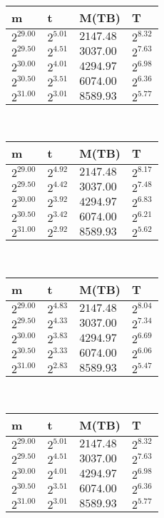  \ 
\begin{tabular}{llll}
m & t & M(TB) & T \\ \hline
$2^{29.00}$ & $2^{5.01}$ & $2147.48$ & $2^{8.32}$ \\
$2^{29.50}$ & $2^{4.51}$ & $3037.00$ & $2^{7.63}$ \\
$2^{30.00}$ & $2^{4.01}$ & $4294.97$ & $2^{6.98}$ \\
$2^{30.50}$ & $2^{3.51}$ & $6074.00$ & $2^{6.36}$ \\
$2^{31.00}$ & $2^{3.01}$ & $8589.93$ & $2^{5.77}$ \\
\end{tabular}
 \ 
\begin{tabular}{llll}
m & t & M(TB) & T \\ \hline
$2^{29.00}$ & $2^{4.92}$ & $2147.48$ & $2^{8.17}$ \\
$2^{29.50}$ & $2^{4.42}$ & $3037.00$ & $2^{7.48}$ \\
$2^{30.00}$ & $2^{3.92}$ & $4294.97$ & $2^{6.83}$ \\
$2^{30.50}$ & $2^{3.42}$ & $6074.00$ & $2^{6.21}$ \\
$2^{31.00}$ & $2^{2.92}$ & $8589.93$ & $2^{5.62}$ \\
\end{tabular}
 \ 
\begin{tabular}{llll}
m & t & M(TB) & T \\ \hline
$2^{29.00}$ & $2^{4.83}$ & $2147.48$ & $2^{8.04}$ \\
$2^{29.50}$ & $2^{4.33}$ & $3037.00$ & $2^{7.34}$ \\
$2^{30.00}$ & $2^{3.83}$ & $4294.97$ & $2^{6.69}$ \\
$2^{30.50}$ & $2^{3.33}$ & $6074.00$ & $2^{6.06}$ \\
$2^{31.00}$ & $2^{2.83}$ & $8589.93$ & $2^{5.47}$ \\
\end{tabular}
 \ 
\begin{tabular}{llll}
m & t & M(TB) & T \\ \hline
$2^{29.00}$ & $2^{5.01}$ & $2147.48$ & $2^{8.32}$ \\
$2^{29.50}$ & $2^{4.51}$ & $3037.00$ & $2^{7.63}$ \\
$2^{30.00}$ & $2^{4.01}$ & $4294.97$ & $2^{6.98}$ \\
$2^{30.50}$ & $2^{3.51}$ & $6074.00$ & $2^{6.36}$ \\
$2^{31.00}$ & $2^{3.01}$ & $8589.93$ & $2^{5.77}$ \\
\end{tabular}
